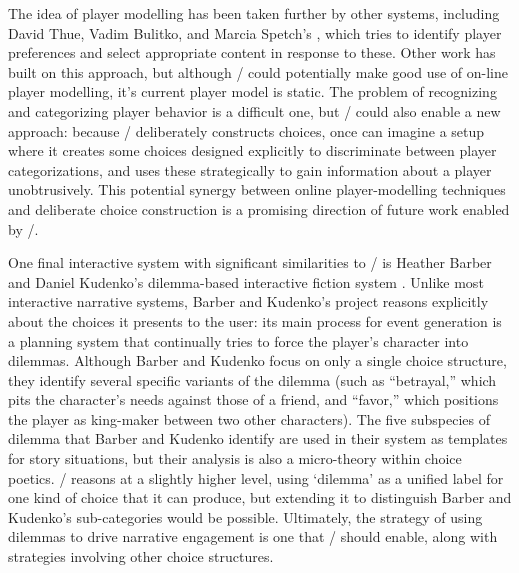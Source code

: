 The idea of player modelling has been taken further by other systems, including  David Thue, Vadim Bulitko, and Marcia Spetch's  \citep{Thue2008}, which tries to identify player preferences and select appropriate content in response to these.
%
Other work has built on this approach, but although \dunyazad/ could potentially make good use of on-line player modelling, it's current player model is static.
%
The problem of recognizing and categorizing player behavior is a difficult one, but \dunyazad/ could also enable a new approach: because \dunyazad/ deliberately constructs choices, once can imagine a setup where it creates some choices designed explicitly to discriminate between player categorizations, and uses these strategically to gain information about a player unobtrusively.
%
This potential synergy between online player-modelling techniques and deliberate choice construction is a promising direction of future work enabled by \dunyazad/.


One final interactive system with significant similarities to \dunyazad/ is Heather Barber and Daniel Kudenko's dilemma-based interactive fiction system \citep{Barber2007a,Barber2007b}.
%
Unlike most interactive narrative systems, Barber and Kudenko's project reasons explicitly about the choices it presents to the user: its main process for event generation is a planning system that continually tries to force the player's character into dilemmas.
%
Although Barber and Kudenko focus on only a single choice structure, they identify several specific variants of the dilemma (such as ``betrayal,'' which pits the character's needs against those of a friend, and ``favor,'' which positions the player as king-maker between two other characters).
%
The five subspecies of dilemma that Barber and Kudenko identify are used in their system as templates for story situations, but their analysis is also a micro-theory within choice poetics.
%
\dunyazad/ reasons at a slightly higher level, using `dilemma' as a unified label for one kind of choice that it can produce, but extending it to distinguish Barber and Kudenko's sub-categories would be possible.
%
Ultimately, the strategy of using dilemmas to drive narrative engagement is one that \dunyazad/ should enable, along with strategies involving other choice structures.




